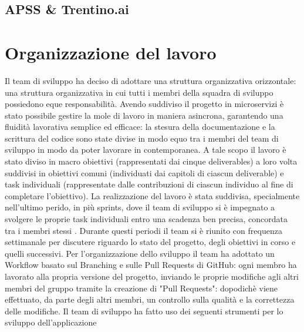 \documentclass{report}
\begin{document}
\subsection{APSS \& Trentino.ai}


\section{Organizzazione del lavoro}

Il team di sviluppo ha deciso di adottare una struttura organizzativa orizzontale: una struttura organizzativa in cui tutti i membri della squadra di sviluppo possiedono eque responsabilità.
Avendo suddiviso il progetto in microservizi è stato possibile gestire la mole di lavoro in maniera asincrona, garantendo una fluidità lavorativa semplice ed efficace: la stesura della documentazione e la scrittura del codice sono state divise in modo equo tra i membri del team di sviluppo
in modo da poter lavorare in contemporanea.
A tale scopo il lavoro è stato diviso in macro obiettivi (rappresentati dai cinque deliverables) a loro volta suddivisi in obiettivi comuni (individuati dai capitoli di ciascun deliverable) e task individuali (rappresentate dalle contribuzioni di ciascun individuo al fine di completare l'obiettivo).
La realizzazione del lavoro è stata suddivisa, specialmente nell'ultimo perido, in più sprints, dove il team di sviluppo si è impegnato a svolgere le proprie task individuali entro una scadenza ben precisa, concordata tra i membri stessi . Durante questi periodi il team si è riunito con frequenza settimanale per discutere riguardo lo stato del progetto, degli obiettivi in corso e quelli successivi.
Per l'organizzazione dello sviluppo il team ha adottato un Workflow basato sul Branching e sulle Pull Requests di GitHub: ogni membro ha lavorato alla propria versione del progetto, inviando le proprie modifiche agli altri membri del gruppo tramite la creazione di "Pull Requests": dopodichè viene effettuato, da parte degli altri membri, un controllo sulla qualità e la correttezza delle modifiche.
Il team di sviluppo ha fatto uso dei seguenti strumenti per lo sviluppo dell'applicazione
\end{document}
